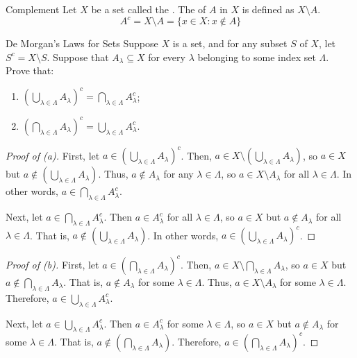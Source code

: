 \documentclass[12pt]{report}
\begin{document}
\begin{dfnbox}{Complement}{}
    Let $X$ be a set called the . The  of $A$ in $X$ is defined as $X \setminus A$.
    \tcblower
    \[ A^c = X \setminus A = \{ x \in X : x \notin A \} \]
\end{dfnbox}

\begin{thmbox}{De Morgan's Laws for Sets}{}
    Suppose $X$ is a set, and for any subset $S$ of $X$, let $S^c = X \setminus S$. Suppose that $A_\lambda \subseteq X$ for every $\lambda$ belonging to some index set $\Lambda$. Prove that:
    \begin{enumerate}[label=(\alph*)]
        \item \( \left( \bigcup_{\lambda \in \Lambda} A_\lambda \right)^c = \bigcap_{\lambda \in \Lambda} A_\lambda^c \);
        \item \( \left( \bigcap_{\lambda \in \Lambda} A_\lambda \right)^c = \bigcup_{\lambda \in \Lambda}A_\lambda^c \).
    \end{enumerate}
    \tcblower
    \begin{proof}[Proof of (a)]
        First, let $a \in \left( \bigcup_{\lambda \in \Lambda} A_\lambda \right)^c$. Then, $a \in X \setminus \left( \bigcup_{\lambda \in \Lambda} A_\lambda \right)$, so $a \in X$ but $a \notin \left( \bigcup_{\lambda \in \Lambda} A_\lambda \right)$. Thus, $a \notin A_\lambda$ for any $\lambda \in \Lambda$, so $a \in X \setminus A_\lambda$ for all $\lambda \in \Lambda$. In other words, $a \in \bigcap_{\lambda \in \Lambda} A_\lambda^c$.

        Next, let $a \in \bigcap_{\lambda \in \Lambda} A_\lambda^c$. Then $a \in A_\lambda^c$ for all $\lambda \in \Lambda$, so $a \in X$ but $a \notin A_\lambda$ for all $\lambda \in \Lambda$. That is, $a \notin \left( \bigcup_{\lambda\in\Lambda} A_\lambda \right)$. In other words, $a \in \left( \bigcup_{\lambda\in\Lambda} A_\lambda \right) ^ c$.
    \end{proof}

    \begin{proof}[Proof of (b)]
        First, let $a \in \left( \bigcap_{\lambda \in \Lambda} A_\lambda \right)^c$. Then, $a \in X \setminus  \bigcap_{\lambda \in \Lambda} A_\lambda$, so $a \in X$ but $a \notin \bigcap_{\lambda \in \Lambda} A_\lambda$. That is, $a \notin A_\lambda$ for some $\lambda \in \Lambda$. Thus, $a \in X \setminus A_\lambda$ for some $\lambda \in \Lambda$. Therefore, $a \in \bigcup_{\lambda \in \Lambda} A_\lambda^c$.

        Next, let $a \in \bigcup_{\lambda \in \Lambda} A_\lambda^c$. Then $a \in A_\lambda^c$ for some $\lambda \in \Lambda$, so $a \in X$ but $a \notin A_\lambda$ for some $\lambda \in \Lambda$. That is, $a \notin \left( \bigcap_{\lambda \in \Lambda} A_\lambda \right)$. Therefore, $a \in  \left( \bigcap_{\lambda \in \Lambda} A_\lambda \right)^c$.
    \end{proof}
\end{thmbox}
\end{document}
